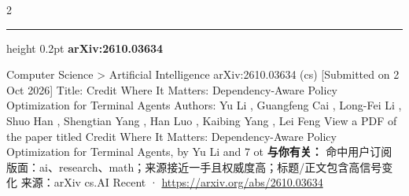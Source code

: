 \documentclass[10.5pt]{ctexart}
\begin{document}
\begin{multicols}{2}
\vspace{2mm}
\hrule height 0.2pt
\vspace{2mm}
{\large\bfseries arXiv:2610.03634}\par
Computer Science > Artificial Intelligence arXiv:2610.03634 (cs) [Submitted on 2 Oct 2026] Title: Credit Where It Matters: Dependency-Aware Policy Optimization for Terminal Agents Authors: Yu Li , Guangfeng Cai , Long-Fei Li , Shuo Han , Shengtian Yang , Han Luo , Kaibing Yang , Lei Feng View a PDF of the paper titled Credit Where It Matters: Dependency-Aware Policy Optimization for Terminal Agents, by Yu Li and 7 ot
\textbf{与你有关：} 命中用户订阅版面：ai、research、math；来源接近一手且权威度高；标题/正文包含高信号变化
{\footnotesize\color{ormuted} 来源：arXiv cs.AI Recent · \url{https://arxiv.org/abs/2610.03634}}
\end{multicols}
\end{document}
